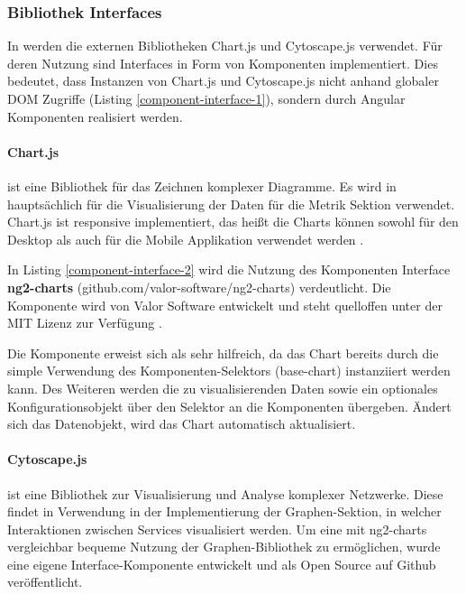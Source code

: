 \subsubsection{Bibliothek Interfaces}

In \projectname{} werden die externen Bibliotheken Chart.js und Cytoscape.js verwendet.
Für deren Nutzung sind Interfaces in Form von Komponenten implementiert.
Dies bedeutet, dass Instanzen von Chart.js und Cytoscape.js nicht anhand globaler \ac{DOM} Zugriffe (Listing \ref{component-interface-1}),
sondern durch Angular Komponenten realisiert werden.


\paragraph{Chart.js}
ist eine Bibliothek für das Zeichnen komplexer Diagramme.
Es wird in \projectname{} hauptsächlich für die Visualisierung der Daten für die Metrik Sektion verwendet.
Chart.js ist responsive implementiert, das heißt die Charts können sowohl für den Desktop
als auch für die Mobile Applikation verwendet werden \cite{Chart80:online}.

\vspace{0.3cm}



\vspace{0.3cm}
In Listing \ref{component-interface-2} wird die Nutzung des Komponenten Interface \textbf{ng2-charts} (github.com/valor-software/ng2-charts) verdeutlicht.
Die Komponente wird von Valor Software entwickelt und steht quelloffen unter der MIT Lizenz zur Verfügung \cite{valor6:online}.

Die Komponente erweist sich als sehr hilfreich, da das Chart bereits durch die simple Verwendung des Komponenten-Selektors (base-chart) instanziiert werden kann.
Des Weiteren werden die zu visualisierenden Daten sowie ein optionales Konfigurationsobjekt über den Selektor an die Komponenten übergeben.
Ändert sich das Datenobjekt, wird das Chart automatisch aktualisiert.



\paragraph{Cytoscape.js}
ist eine Bibliothek zur Visualisierung und Analyse komplexer Netzwerke.
Diese findet in \projectname{} Verwendung in der Implementierung der Graphen-Sektion,
in welcher Interaktionen zwischen Services visualisiert werden.
Um eine mit ng2-charts vergleichbar bequeme Nutzung der Graphen-Bibliothek zu ermöglichen,
wurde eine eigene Interface-Komponente entwickelt und als Open Source auf Github veröffentlicht.

